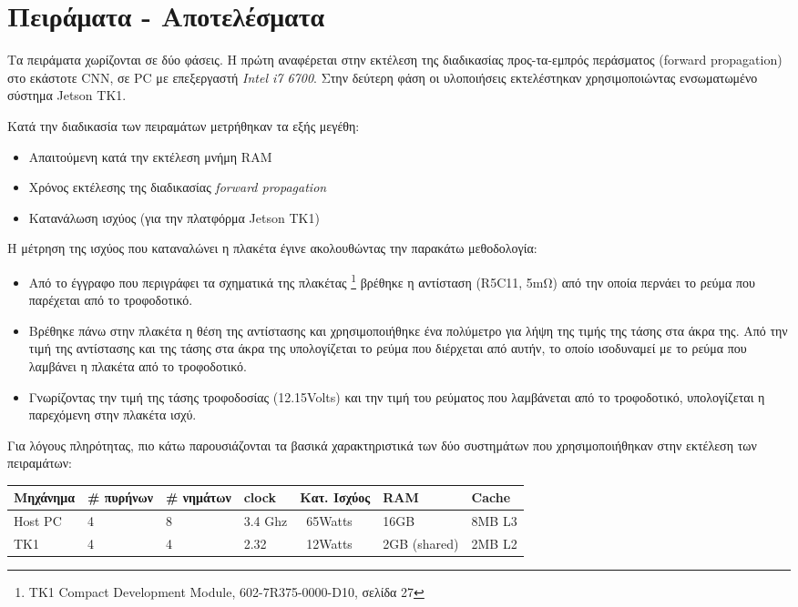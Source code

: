 \chapter{Πειράματα - Αποτελέσματα}
\label{chapter:experiments}

Τα πειράματα χωρίζονται σε δύο φάσεις. Η πρώτη αναφέρεται στην εκτέλεση
της διαδικασίας προς-τα-εμπρός περάσματος (forward propagation) στο εκάστοτε
CNN, σε PC με επεξεργαστή \emph{Intel i7 6700}.
Στην δεύτερη φάση οι υλοποιήσεις εκτελέστηκαν χρησιμοποιώντας
ενσωματωμένο σύστημα Jetson TK1.

Κατά την διαδικασία των πειραμάτων μετρήθηκαν τα εξής μεγέθη:
\begin{itemize}
  \item{Απαιτούμενη κατά την εκτέλεση μνήμη RAM}
  \item{Χρόνος εκτέλεσης της διαδικασίας \emph{forward propagation}}
  \item{Κατανάλωση ισχύος (για την πλατφόρμα Jetson TK1)}
\end{itemize}

Η μέτρηση της ισχύος που καταναλώνει η πλακέτα έγινε ακολουθώντας την παρακάτω μεθοδολογία:
\begin{itemize}
  \item{Από το έγγραφο που περιγράφει τα σχηματικά της πλακέτας \footnote{TK1 Compact Development Module,  602-7R375-0000-D10, σελίδα 27}
    βρέθηκε η αντίσταση (R5C11, 5mΩ) από την οποία περνάει το ρεύμα που παρέχεται από το τροφοδοτικό.}
  \item{Βρέθηκε πάνω στην πλακέτα η θέση της αντίστασης και χρησιμοποιήθηκε ένα
    πολύμετρο για λήψη της τιμής της τάσης στα άκρα της.
    Από την τιμή της αντίστασης και της τάσης στα άκρα της υπολογίζεται το ρεύμα που διέρχεται από αυτήν,
    το οποίο ισοδυναμεί με το ρεύμα που λαμβάνει η πλακέτα από το τροφοδοτικό.}
  \item{Γνωρίζοντας την τιμή της τάσης τροφοδοσίας (12.15Volts) και την τιμή
    του ρεύματος που λαμβάνεται από το τροφοδοτικό, υπολογίζεται η παρεχόμενη στην πλακέτα ισχύ.}
\end{itemize}

Για λόγους πληρότητας, πιο κάτω παρουσιάζονται τα βασικά χαρακτηριστικά
των δύο συστημάτων που χρησιμοποιήθηκαν στην εκτέλεση των πειραμάτων:

\begin{center}
\small
\begin{tabular}{ | l | l | l | l | l | l | l | }
  \hline
  \rowcolor{Gray}
  Μηχάνημα & \# πυρήνων & \# νημάτων & clock & Κατ. Ισχύος & RAM & Cache \\
  \hline
  Host PC & 4 & 8 & 3.4 Ghz & ~65Watts & 16GB & 8MΒ L3 \\
  \hline
  TK1 & 4 & 4 & 2.32 & ~12Watts & 2GB (shared) & 2MB L2 \\
  \hline
\end{tabular}
\end{center}

